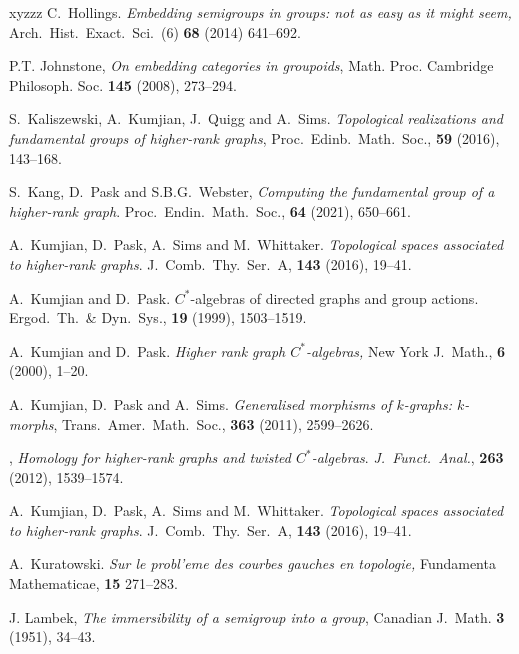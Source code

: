 \documentclass[12pt]{amsart}
\theoremstyle{definition}
\theoremstyle{remark}
\numberwithin{equation}{section}
\begin{document}
\begin{thebibliography}{xyzzz}
\newblock C.~Hollings.
\newblock \emph{Embedding semigroups in groups: not as easy as it might seem,}
\newblock Arch.\ Hist.\ Exact.\ Sci.\ (6) \textbf{68} (2014) 641--692.


 P.T. Johnstone, \emph{On embedding categories in groupoids}, Math. Proc. Cambridge Philosoph. Soc. \textbf{145} (2008), 273--294.



 S.\ Kaliszewski, A.\ Kumjian, J.\ Quigg and A.\ Sims. \emph{Topological realizations and fundamental groups of higher-rank graphs}, Proc.\ Edinb.\ Math.\ Soc., \textbf{59} (2016), 143--168.



 S.\ Kang, D.\ Pask  and S.B.G.\ Webster, \emph{Computing the fundamental group of a higher-rank graph}.  Proc.\ Endin.\ Math.\ Soc., \textbf{64} (2021), 650--661.

 A.\ Kumjian, D.\ Pask, A.\ Sims and M.\ Whittaker. \emph{Topological spaces associated to higher-rank graphs}. J.\ Comb.\ Thy.\ Ser.\ A, \textbf{143} (2016), 19--41.



 A.~Kumjian and D.~Pask.
\newblock $C^*$-algebras of directed graphs and group actions.
\newblock Ergod.\ Th.\ \& Dyn.\ Sys., \textbf{19 }(1999), 1503--1519.

 A.~Kumjian and D.~Pask.
\newblock \emph{Higher rank graph $C^*$-algebras,}
\newblock New York J.\ Math., {\bf 6} (2000), 1--20.

 A.~Kumjian, D.~Pask and A.~Sims. \emph{Generalised morphisms of $k$-graphs: $k$-morphs}, Trans.\ Amer.\ Math.\ Soc.,  {\bf 363} (2011), 2599--2626. 

, \emph{Homology for higher-rank graphs and twisted $C^*$-algebras}. {\it J.\ Funct.\ Anal.}, {\bf 263} (2012), 1539--1574.

 A.\ Kumjian, D.\ Pask, A.\ Sims and M.\ Whittaker. \emph{Topological spaces associated to higher-rank graphs}. J.\ Comb.\ Thy.\ Ser.\ A, \textbf{143} (2016), 19--41.

 A.\ Kuratowski. \emph{Sur le probl'{e}me des courbes gauches en topologie,} Fundamenta Mathematicae, \textbf{15} 271--283.


 J. Lambek, \emph{The immersibility of a semigroup into a group}, Canadian J.\ Math. \textbf{3} (1951), 34--43.


\end{thebibliography}
\end{document}
